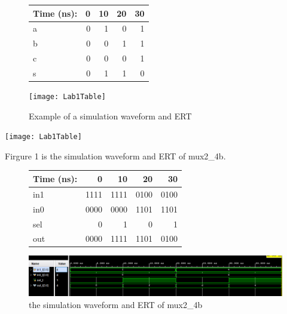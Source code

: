\documentclass[11pt]{article}
\begin{document}
	
	\begin{figure}[ht]\centering
		\begin{tabular}{l|rrrr}
			Time (ns): & 0 & 10 & 20 & 30 \\
			\midrule
			a & 0 & 1 & 0 & 1 \\
			b & 0 & 0 & 1 & 1 \\
			\midrule
			c & 0 & 0 & 0 & 1 \\
			s & 0 & 1 & 1 & 0 \\
			\bottomrule
		\end{tabular}\medskip
		
		\texttt{[image: Lab1Table]}
		\caption{Example of a simulation waveform and ERT}
		\label{fig:sim_with_table}
	\end{figure}
	
	\begin{center}
		\texttt{[image: Lab1Table]}
	\end{center}
	
	
	
	
	
	
	Firgure 1 is the simulation waveform and ERT of mux2_4b.\\
	\begin{figure}[ht]\centering
		\begin{tabular}{l|rrrr}
			Time (ns): & 0 & 10 & 20 & 30 \\
			\midrule
			in1 & 1111 & 1111 & 0100 & 0100 \\
			in0 & 0000 & 0000 & 1101 & 1101 \\
			sel & 0 & 1 & 0 & 1 \\
			\midrule
			out & 0000 & 1111 & 1101 & 0100 \\
			\bottomrule
		\end{tabular}\medskip
		
		\includegraphics[width=1\textwidth]{mux2_4b_simulation}
		\caption{the simulation waveform and ERT of mux2_4b}
		\label{fig:mux2_4b_simulation}
	\end{figure}
	
\end{document}
